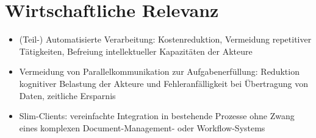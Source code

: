 \chapter{Wirtschaftliche Relevanz}
%

\begin{itemize}
\item (Teil-) Automatisierte Verarbeitung: Kostenreduktion, Vermeidung repetitiver Tätigkeiten, Befreiung intellektueller Kapazitäten der Akteure
\item Vermeidung von Parallelkommunikation zur Aufgabenerfüllung: Reduktion kognitiver Belastung der Akteure und Fehleranfälligkeit bei Übertragung von Daten, zeitliche Ersparnis
\item Slim-Clients: vereinfachte Integration in bestehende Prozesse ohne Zwang eines komplexen Document-Management- oder Workflow-Systems
\end{itemize}
